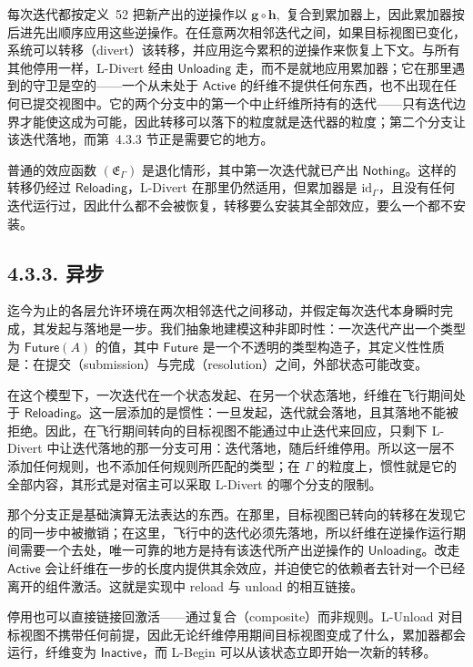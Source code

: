 每次迭代都按定义~52 把新产出的逆操作以 \({ \boldsymbol { g } } \circ { \boldsymbol { h } } ,\) 复合到累加器上，因此累加器按后进先出顺序应用这些逆操作。在任意两次相邻迭代之间，如果目标视图已变化，系统可以转移（divert）该转移，并应用迄今累积的逆操作来恢复上下文。与所有其他停用一样，L-Divert 经由 \(\mathsf { U n l o a d i n g }\) 走，而不是就地应用累加器；它在那里遇到的守卫是空的——一个从未处于 \(\mathsf { A c t i v e }\) 的纤维不提供任何东西，也不出现在任何已提交视图中。它的两个分支中的第一个中止纤维所持有的迭代——只有迭代边界才能使这成为可能，因此转移可以落下的粒度就是迭代器的粒度；第二个分支让该迭代落地，而第~4.3.3 节正是需要它的地方。

普通的效应函数 \(( \mathfrak { E } _ { \Gamma } )\) 是退化情形，其中第一次迭代就已产出 \(\mathsf { N o t h i n g }\)。这样的转移仍经过 \(\mathsf { R e l o a d i n g }\)，L-Divert 在那里仍然适用，但累加器是 \(\mathrm { i d } _ { \Gamma }\)，且没有任何迭代运行过，因此什么都不会被恢复，转移要么安装其全部效应，要么一个都不安装。

\subsection{4.3.3. 异步}\label{asynchrony}

迄今为止的各层允许环境在两次相邻迭代之间移动，并假定每次迭代本身瞬时完成，其发起与落地是一步。我们抽象地建模这种非即时性：一次迭代产出一个类型为 \(\mathsf { F u t u r e } ( A )\) 的值，其中 \(\mathsf { F u t u r e }\) 是一个不透明的类型构造子，其定义性性质是：在提交（submission）与完成（resolution）之间，外部状态可能改变。

在这个模型下，一次迭代在一个状态发起、在另一个状态落地，纤维在飞行期间处于 \(\mathsf { R e l o a d i n g }\)。这一层添加的是惯性：一旦发起，迭代就会落地，且其落地不能被拒绝。因此，在飞行期间转向的目标视图不能通过中止迭代来回应，只剩下 L-Divert 中让迭代落地的那一分支可用：迭代落地，随后纤维停用。所以这一层不添加任何规则，也不添加任何规则所匹配的类型；在 \(\Gamma\) 的粒度上，惯性就是它的全部内容，其形式是对宿主可以采取 L-Divert 的哪个分支的限制。

那个分支正是基础演算无法表达的东西。在那里，目标视图已转向的转移在发现它的同一步中被撤销；在这里，飞行中的迭代必须先落地，所以纤维在逆操作运行期间需要一个去处，唯一可靠的地方是持有该迭代所产出逆操作的 \(\mathsf { U n l o a d i n g }\)。改走 \(\mathsf { A c t i v e }\) 会让纤维在一步的长度内提供其余效应，并迫使它的依赖者去针对一个已经离开的组件激活。这就是实现中 reload 与 unload 的相互链接。

停用也可以直接链接回激活——通过复合（composite）而非规则。L-Unload 对目标视图不携带任何前提，因此无论纤维停用期间目标视图变成了什么，累加器都会运行，纤维变为 \(\mathsf { I n a c t i v e }\)，而 L-Begin 可以从该状态立即开始一次新的转移。

